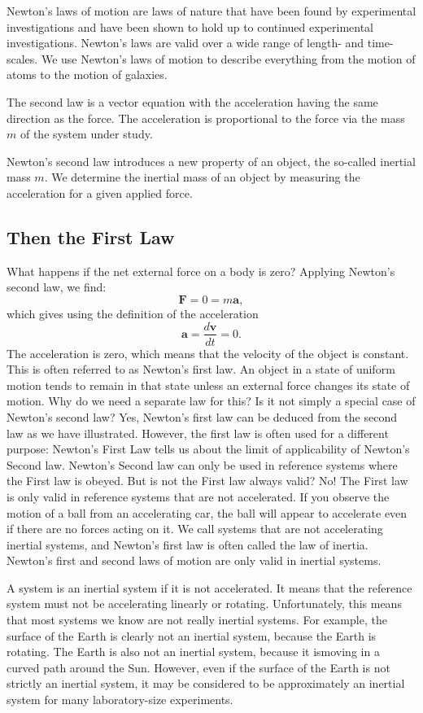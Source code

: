 \documentclass[%
oneside,                 %
final,                   %
10pt]{article}
\begin{document}
Newton’s laws of motion are laws of nature that have been found by experimental
investigations and have been shown to hold up to continued experimental investigations.
Newton’s laws are valid over a wide range of length- and time-scales. We
use Newton’s laws of motion to describe everything from the motion of atoms to the
motion of galaxies.

The second law is a vector equation with the acceleration having the same
direction as the force. The acceleration is proportional to the force via the mass $m$ of the system under study.

Newton’s second law introduces a new property of an object, the so-called 
inertial mass $m$. We determine the inertial mass of an object by measuring the
acceleration for a given applied force.

\subsection*{Then the First Law}

What happens if the net external force on a body is zero? Applying Newton’s second
law, we find:
\[
\bm{F} = 0 = m\bm{a},
\]
which gives using the definition of the acceleration
\[
\bm{a} = \frac{d\bm{v}}{dt}=0.
\]
The acceleration is zero, which means that the velocity of the object is constant. This
is often referred to as Newton’s first law. An object in a state of uniform motion tends to remain in
that state unless an external force changes its state of motion.
Why do we need a separate law for this? Is it not simply a special case of Newton’s
second law? Yes, Newton’s first law can be deduced from the second law as we have
illustrated. However, the first law is often used for a different purpose: Newton’s
First Law tells us about the limit of applicability of Newton’s Second law. Newton’s
Second law can only be used in reference systems where the First law is obeyed. But
is not the First law always valid? No! The First law is only valid in reference systems
that are not accelerated. If you observe the motion of a ball from an accelerating
car, the ball will appear to accelerate even if there are no forces acting on it. We call
systems that are not accelerating inertial systems, and Newton’s first law is often
called the law of inertia. Newton’s first and second laws of motion are only valid in
inertial systems. 

A system is an inertial system if it is not accelerated. It means that the reference system
must not be accelerating linearly or rotating. Unfortunately, this means that most
systems we know are not really inertial systems. For example, the surface of the
Earth is clearly not an inertial system, because the Earth is rotating. The Earth is also
not an inertial system, because it ismoving in a curved path around the Sun. However,
even if the surface of the Earth is not strictly an inertial system, it may be considered
to be approximately an inertial system for many laboratory-size experiments.
\end{document}

